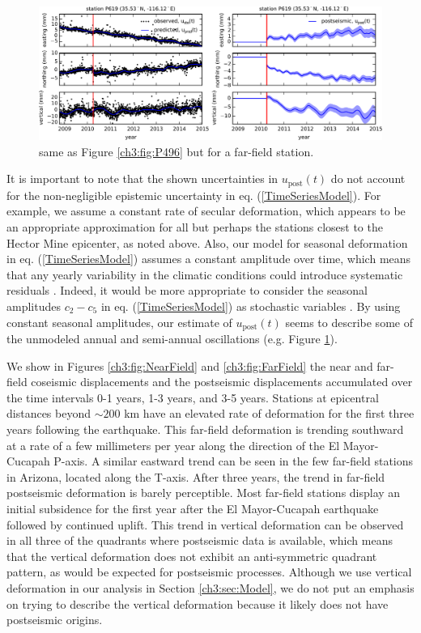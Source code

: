 \begin{figure}\label{ch3:fig:P619}
\noindent\includegraphics[scale=1.0]{ch3/figures/2016jb013114-p03}
\caption{same as Figure \ref{ch3:fig:P496} but for a far-field station.} 
\end{figure}

It is important to note that the shown uncertainties in $u_\mathrm{post}(t)$ do not account for the non-negligible epistemic uncertainty in eq. (\ref{TimeSeriesModel}).  For example, we assume a constant rate of secular deformation, which appears to be an appropriate approximation for all but perhaps the stations closest to the Hector Mine epicenter, as noted above.  Also, our model for seasonal deformation in eq. (\ref{TimeSeriesModel}) assumes a constant amplitude over time, which means that any yearly variability in the climatic conditions could introduce systematic residuals \citep{Davis2012}. Indeed, it would be more appropriate to consider the seasonal amplitudes $c_2-c_5$ in eq. (\ref{TimeSeriesModel}) as stochastic variables \citep{Murray2005}. By using constant seasonal amplitudes, our estimate of $u_\mathrm{post}(t)$ seems to describe some of the unmodeled annual and semi-annual oscillations (e.g. Figure \ref{ch3:fig:P619}).          

We show in Figures \ref{ch3:fig:NearField} and \ref{ch3:fig:FarField} the near and far-field coseismic displacements and the postseismic displacements accumulated over the time intervals 0-1 years, 1-3 years, and 3-5 years.  Stations at epicentral distances beyond ${\sim}200$ km have an elevated rate of deformation for the first three years following the earthquake.  This far-field deformation is trending southward at a rate of a few millimeters per year along the direction of the El Mayor-Cucapah P-axis.  A similar eastward trend can be seen in the few far-field stations in Arizona, located along the T-axis.  After three years, the trend in far-field postseismic deformation is barely perceptible.  Most far-field stations display an initial subsidence for the first year after the El Mayor-Cucapah earthquake followed by continued uplift.  This trend in vertical deformation can be observed in all three of the quadrants where postseismic data is available, which means that the vertical deformation does not exhibit an anti-symmetric quadrant pattern, as would be expected for postseismic processes.  Although we use vertical deformation in our analysis in Section \ref{ch3:sec:Model},  we do not put an emphasis on trying to describe the vertical deformation because it likely does not have postseismic origins.        

